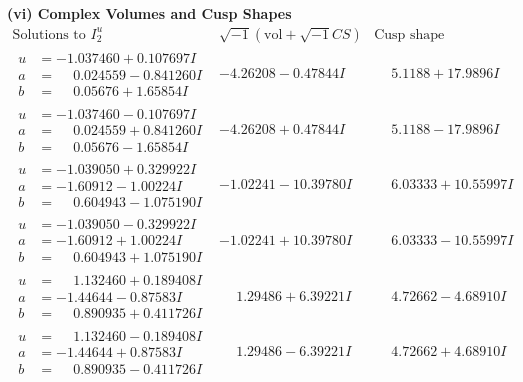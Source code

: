 \documentclass[1p]{elsarticle_modified}
\theoremstyle{definition}
\newcommand{\I}{\sqrt{-1}}
\begin{document}
\newpage\flushleft \textbf{(vi) Complex Volumes and Cusp Shapes}
$$\begin{array}{c|c|c}  
\text{Solutions to }I^u_{2}& \I (\text{vol} + \sqrt{-1}CS) & \text{Cusp shape}\\
 \hline 
\begin{aligned}
u &= -1.037460 + 0.107697 I \\
a &= \phantom{-}0.024559 - 0.841260 I \\
b &= \phantom{-}0.05676 + 1.65854 I\end{aligned}
 & -4.26208 - 0.47844 I & \phantom{-}5.1188 + 17.9896 I \\ \hline\begin{aligned}
u &= -1.037460 - 0.107697 I \\
a &= \phantom{-}0.024559 + 0.841260 I \\
b &= \phantom{-}0.05676 - 1.65854 I\end{aligned}
 & -4.26208 + 0.47844 I & \phantom{-}5.1188 - 17.9896 I \\ \hline\begin{aligned}
u &= -1.039050 + 0.329922 I \\
a &= -1.60912 - 1.00224 I \\
b &= \phantom{-}0.604943 - 1.075190 I\end{aligned}
 & -1.02241 - 10.39780 I & \phantom{-}6.03333 + 10.55997 I \\ \hline\begin{aligned}
u &= -1.039050 - 0.329922 I \\
a &= -1.60912 + 1.00224 I \\
b &= \phantom{-}0.604943 + 1.075190 I\end{aligned}
 & -1.02241 + 10.39780 I & \phantom{-}6.03333 - 10.55997 I \\ \hline\begin{aligned}
u &= \phantom{-}1.132460 + 0.189408 I \\
a &= -1.44644 - 0.87583 I \\
b &= \phantom{-}0.890935 + 0.411726 I\end{aligned}
 & \phantom{-}1.29486 + 6.39221 I & \phantom{-}4.72662 - 4.68910 I \\ \hline\begin{aligned}
u &= \phantom{-}1.132460 - 0.189408 I \\
a &= -1.44644 + 0.87583 I \\
b &= \phantom{-}0.890935 - 0.411726 I\end{aligned}
 & \phantom{-}1.29486 - 6.39221 I & \phantom{-}4.72662 + 4.68910 I \\ \hline\begin{aligned}

\end{aligned}
\end{array}$$
\end{document}

